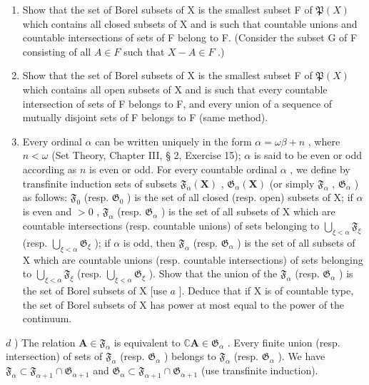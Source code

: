 \begin{enumerate}
\def\labelenumi{\alph{enumi})}
\item
  Show that the set of Borel subsets of X is the smallest subset F of \(\mathfrak{P}(X)\) which contains all closed subsets of X and is such that countable unions and countable intersections of sets of F belong to F. (Consider the subset G of F consisting of all \(A \in F\) such that \(X - A \in F\) .)
\item
  Show that the set of Borel subsets of X is the smallest subset F of \(\mathfrak{P}(X)\) which contains all open subsets of X and is such that every countable intersection of sets of F belongs to F, and every union of a sequence of mutually disjoint sets of F belongs to F (same method).
\item
  Every ordinal \(\alpha\) can be written uniquely in the form \(\alpha = \omega\beta + n\) , where \(n < \omega\) (Set Theory, Chapter III, § 2, Exercise 15); \(\alpha\) is said to be even or odd according as \(n\) is even or odd. For every countable ordinal \(\alpha\) , we define by transfinite induction sets of subsets \(\mathfrak{F}_{\alpha}(\mathbf{X})\) , \(\mathfrak{G}_{\alpha}(\mathbf{X})\) (or simply \(\mathfrak{F}_{\alpha}\) , \(\mathfrak{G}_{\alpha}\) ) as follows: \(\mathfrak{F}_0\) (resp. \(\mathfrak{G}_0\) ) is the set of all closed (resp. open) subsets of X; if \(\alpha\) is even and \(>0\) , \(\mathfrak{F}_{\alpha}\) (resp. \(\mathfrak{G}_{\alpha}\) ) is the set of all subsets of X which are countable intersections (resp. countable unions) of sets belonging to \(\bigcup_{\xi < \alpha} \mathfrak{F}_{\xi}\) (resp. \(\bigcup_{\xi < \alpha} \mathfrak{G}_{\xi}\) ); if \(\alpha\) is odd, then \(\mathfrak{F}_{\alpha}\) (resp. \(\mathfrak{G}_{\alpha}\) ) is the set of all subsets of X which are countable unions (resp. countable intersections) of sets belonging to \(\bigcup_{\xi < \alpha} \mathfrak{F}_{\xi}\) (resp. \(\bigcup_{\xi < \alpha} \mathfrak{G}_{\xi}\) ). Show that the union of the \(\mathfrak{F}_{\alpha}\) (resp. \(\mathfrak{G}_{\alpha}\) ) is the set of Borel subsets of X {[}use \(a\) {]}. Deduce that if X is of countable type, the set of Borel subsets of X has power at most equal to the power of the continuum.
\end{enumerate}

\(d\) ) The relation \(\mathbf{A}\in\mathfrak{F}_{\alpha}\) is equivalent to \(\mathbb{C}\mathbf{A}\in\mathfrak{G}_{\alpha}\) . Every finite union (resp. intersection) of sets of \(\mathfrak{F}_{\alpha}\) (resp. \(\mathfrak{G}_{\alpha}\) ) belongs to \(\mathfrak{F}_{\alpha}\) (resp. \(\mathfrak{G}_{\alpha}\) ). We have \(\mathfrak{F}_{\alpha}\subset\mathfrak{F}_{\alpha+1}\cap\mathfrak{G}_{\alpha+1}\) and \(\mathfrak{G}_{\alpha}\subset\mathfrak{F}_{\alpha+1}\cap\mathfrak{G}_{\alpha+1}\) (use transfinite induction).

